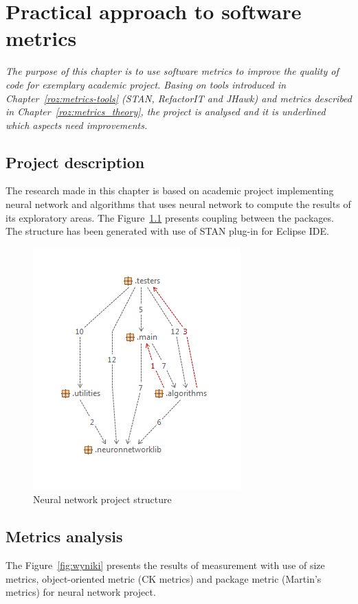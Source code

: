 \chapter{Practical approach to software metrics} \label{roz:metrics-practic}

\textit{The purpose of this chapter is to use software metrics to improve the quality of code for exemplary academic project. Basing on tools introduced in Chapter~\ref{roz:metrics-tools} (STAN, RefactorIT and JHawk) and metrics described in Chapter~\ref{roz:metrics_theory}, the project is analysed and it is underlined which aspects need improvements.}

\section{Project description}
The research made in this chapter is based on academic project implementing neural network and algorithms that uses neural network to compute the results of its exploratory areas. The Figure~\ref{fig:structureneural} presents coupling between the packages. The structure has been generated with use of STAN plug-in for Eclipse \ac{IDE}. 

\begin{figure}[h!]
 	\centering
 	\includegraphics[scale=1]{img/str.png} 
 	\caption{Neural network project structure}		
 	\label{fig:structureneural}
 \end{figure} 

\section{Metrics analysis}
The Figure~\ref{fig:wyniki} presents the results of measurement with use of size metrics, object-oriented metric (\ac{CK metrics}) and package metric (Martin's metrics) for neural network project.  

